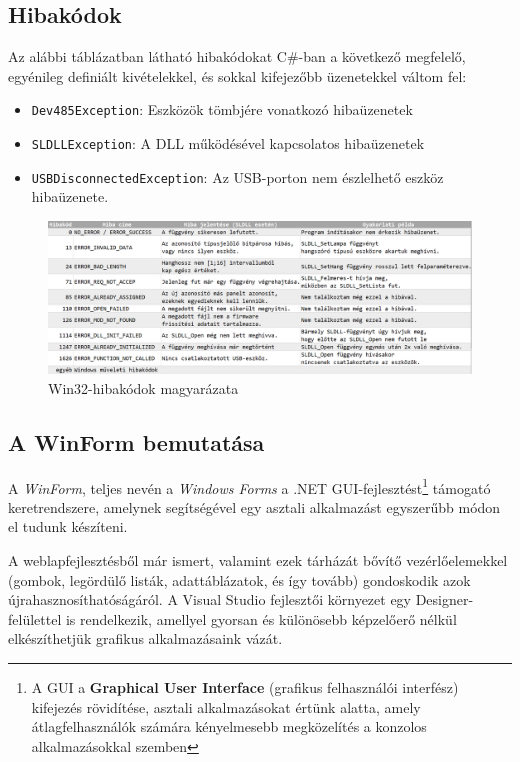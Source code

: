 \documentclass[tocnopagenum]{thesis-ekf}
\theoremstyle{definition}
\theoremstyle{remark}
\begin{document}
	\subsection{Hibakódok}
	Az alábbi táblázatban látható hibakódokat C\#-ban a következő megfelelő, egyénileg definiált kivételekkel, és sokkal kifejezőbb üzenetekkel váltom fel:
	\begin{itemize}
		\item \verb*|Dev485Exception|: Eszközök tömbjére vonatkozó hibaüzenetek
		\item \verb*|SLDLLException|: A DLL működésével kapcsolatos hibaüzenetek
		\item \verb*|USBDisconnectedException|: Az USB-porton nem észlelhető eszköz hibaüzenete.
	\end{itemize}
	\begin{figure}[h!]
		\centering
		\hspace*{-0.5in}
		\includegraphics[scale=0.5]{images/errcodes.png}
		\caption[Hibakódok és magyarázataik]{Win32-hibakódok magyarázata}
		\label{fig:errcodes}
	\end{figure}
	\subsection{A WinForm bemutatása}
	A \textit{WinForm}, teljes nevén a \textit{Windows Forms} a .NET GUI-fejlesztést\footnote{A GUI a \textbf{Graphical User Interface} (grafikus felhasználói interfész) kifejezés rövidítése, asztali alkalmazásokat értünk alatta, amely átlagfelhasználók számára kényelmesebb megközelítés a konzolos alkalmazásokkal szemben} támogató keretrendszere, amelynek segítségével egy asztali alkalmazást egyszerűbb módon el tudunk készíteni. 
	
	A weblapfejlesztésből már ismert, valamint ezek tárházát bővítő vezérlőelemekkel (gombok, legördülő listák, adattáblázatok, és így tovább) gondoskodik azok újrahasznosíthatóságáról. A Visual Studio fejlesztői környezet egy Designer-felülettel is rendelkezik, amellyel gyorsan és különösebb képzelőerő nélkül elkészíthetjük grafikus alkalmazásaink vázát.
	
\end{document}
